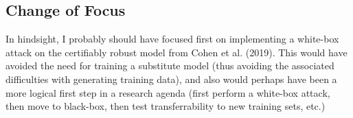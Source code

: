 \documentclass{article}
\begin{document}
\subsection{Change of Focus}
In hindsight, I probably should have focused first on implementing a white-box attack on the certifiably robust model from Cohen et al. (2019). This would have avoided the need for training a substitute model (thus avoiding the associated difficulties with generating training data), and also would perhaps have been a more logical first step in a research agenda (first perform a white-box attack, then move to black-box, then test transferrability to new training sets, etc.)

\newpage



\end{document}
